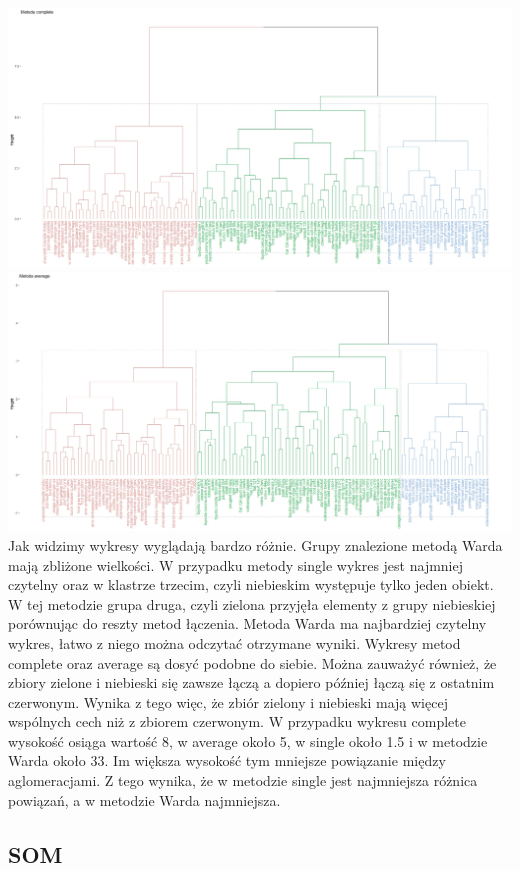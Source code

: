 \documentclass{article}
\begin{document}
        \includegraphics[width = \textwidth]{complete_fig.jpeg}
        \includegraphics[width = \textwidth]{average_fig.jpeg}
        Jak widzimy wykresy wyglądają bardzo różnie. Grupy znalezione metodą Warda mają zbliżone wielkości. W przypadku metody single  wykres 
        jest najmniej czytelny oraz w klastrze trzecim, czyli niebieskim występuje tylko jeden obiekt. W tej metodzie grupa druga, czyli zielona 
        przyjęła elementy z grupy niebieskiej porównując do reszty metod łączenia. Metoda Warda ma najbardziej czytelny wykres, łatwo z niego 
        można odczytać otrzymane wyniki. Wykresy metod complete oraz average są dosyć podobne do siebie. 
        Można zauważyć również, że zbiory zielone i niebieski się zawsze łączą a dopiero później łączą się z ostatnim czerwonym. Wynika z tego 
        więc, że zbiór zielony i niebieski mają więcej wspólnych cech niż z zbiorem czerwonym. W przypadku wykresu complete wysokość osiąga 
        wartość 8, w average około 5, w single około 1.5 i w metodzie Warda około 33. Im większa wysokość tym mniejsze powiązanie między 
        aglomeracjami. Z tego wynika, że w metodzie single jest najmniejsza różnica powiązań, a w metodzie Warda najmniejsza.


    \subsection{SOM}
\end{document}
